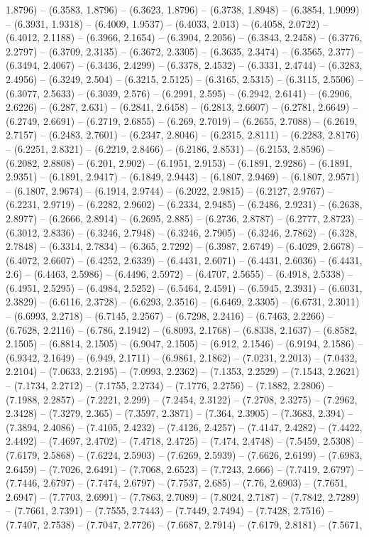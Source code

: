 1.8796) -- (6.3583, 1.8796) -- (6.3623, 1.8796) -- (6.3738, 1.8948) -- (6.3854, 1.9099) -- (6.3931, 1.9318) -- (6.4009, 1.9537) -- (6.4033, 2.013) -- (6.4058, 2.0722) -- (6.4012, 2.1188) -- (6.3966, 2.1654) -- (6.3904, 2.2056) -- (6.3843, 2.2458) -- (6.3776, 2.2797) -- (6.3709, 2.3135) -- (6.3672, 2.3305) -- (6.3635, 2.3474) -- (6.3565, 2.377) -- (6.3494, 2.4067) -- (6.3436, 2.4299) -- (6.3378, 2.4532) -- (6.3331, 2.4744) -- (6.3283, 2.4956) -- (6.3249, 2.504) -- (6.3215, 2.5125) -- (6.3165, 2.5315) -- (6.3115, 2.5506) -- (6.3077, 2.5633) -- (6.3039, 2.576) -- (6.2991, 2.595) -- (6.2942, 2.6141) -- (6.2906, 2.6226) -- (6.287, 2.631) -- (6.2841, 2.6458) -- (6.2813, 2.6607) -- (6.2781, 2.6649) -- (6.2749, 2.6691) -- (6.2719, 2.6855) -- (6.269, 2.7019) -- (6.2655, 2.7088) -- (6.2619, 2.7157) -- (6.2483, 2.7601) -- (6.2347, 2.8046) -- (6.2315, 2.8111) -- (6.2283, 2.8176) -- (6.2251, 2.8321) -- (6.2219, 2.8466) -- (6.2186, 2.8531) -- (6.2153, 2.8596) -- (6.2082, 2.8808) -- (6.201, 2.902) -- (6.1951, 2.9153) -- (6.1891, 2.9286) -- (6.1891, 2.9351) -- (6.1891, 2.9417) -- (6.1849, 2.9443) -- (6.1807, 2.9469) -- (6.1807, 2.9571) -- (6.1807, 2.9674) -- (6.1914, 2.9744) -- (6.2022, 2.9815) -- (6.2127, 2.9767) -- (6.2231, 2.9719) -- (6.2282, 2.9602) -- (6.2334, 2.9485) -- (6.2486, 2.9231) -- (6.2638, 2.8977) -- (6.2666, 2.8914) -- (6.2695, 2.885) -- (6.2736, 2.8787) -- (6.2777, 2.8723) -- (6.3012, 2.8336) -- (6.3246, 2.7948) -- (6.3246, 2.7905) -- (6.3246, 2.7862) -- (6.328, 2.7848) -- (6.3314, 2.7834) -- (6.365, 2.7292) -- (6.3987, 2.6749) -- (6.4029, 2.6678) -- (6.4072, 2.6607) -- (6.4252, 2.6339) -- (6.4431, 2.6071) -- (6.4431, 2.6036) -- (6.4431, 2.6) -- (6.4463, 2.5986) -- (6.4496, 2.5972) -- (6.4707, 2.5655) -- (6.4918, 2.5338) -- (6.4951, 2.5295) -- (6.4984, 2.5252) -- (6.5464, 2.4591) -- (6.5945, 2.3931) -- (6.6031, 2.3829) -- (6.6116, 2.3728) -- (6.6293, 2.3516) -- (6.6469, 2.3305) -- (6.6731, 2.3011) -- (6.6993, 2.2718) -- (6.7145, 2.2567) -- (6.7298, 2.2416) -- (6.7463, 2.2266) -- (6.7628, 2.2116) -- (6.786, 2.1942) -- (6.8093, 2.1768) -- (6.8338, 2.1637) -- (6.8582, 2.1505) -- (6.8814, 2.1505) -- (6.9047, 2.1505) -- (6.912, 2.1546) -- (6.9194, 2.1586) -- (6.9342, 2.1649) -- (6.949, 2.1711) -- (6.9861, 2.1862) -- (7.0231, 2.2013) -- (7.0432, 2.2104) -- (7.0633, 2.2195) -- (7.0993, 2.2362) -- (7.1353, 2.2529) -- (7.1543, 2.2621) -- (7.1734, 2.2712) -- (7.1755, 2.2734) -- (7.1776, 2.2756) -- (7.1882, 2.2806) -- (7.1988, 2.2857) -- (7.2221, 2.299) -- (7.2454, 2.3122) -- (7.2708, 2.3275) -- (7.2962, 2.3428) -- (7.3279, 2.365) -- (7.3597, 2.3871) -- (7.364, 2.3905) -- (7.3683, 2.394) -- (7.3894, 2.4086) -- (7.4105, 2.4232) -- (7.4126, 2.4257) -- (7.4147, 2.4282) -- (7.4422, 2.4492) -- (7.4697, 2.4702) -- (7.4718, 2.4725) -- (7.474, 2.4748) -- (7.5459, 2.5308) -- (7.6179, 2.5868) -- (7.6224, 2.5903) -- (7.6269, 2.5939) -- (7.6626, 2.6199) -- (7.6983, 2.6459) -- (7.7026, 2.6491) -- (7.7068, 2.6523) -- (7.7243, 2.666) -- (7.7419, 2.6797) -- (7.7446, 2.6797) -- (7.7474, 2.6797) -- (7.7537, 2.685) -- (7.76, 2.6903) -- (7.7651, 2.6947) -- (7.7703, 2.6991) -- (7.7863, 2.7089) -- (7.8024, 2.7187) -- (7.7842, 2.7289) -- (7.7661, 2.7391) -- (7.7555, 2.7443) -- (7.7449, 2.7494) -- (7.7428, 2.7516) -- (7.7407, 2.7538) -- (7.7047, 2.7726) -- (7.6687, 2.7914) -- (7.6179, 2.8181) -- (7.5671, 